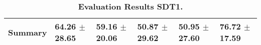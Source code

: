 \begin{table}[htb]
{\begin{tabular}{llllll}
\midrule
\textbf{Summary                                  } &                  \phantom{0}64.26 $\pm$ 28.65 &                      \phantom{0}59.16 $\pm$ 20.06 &                  \phantom{0}50.87 $\pm$ 29.62 &                  \phantom{0}50.95 $\pm$ 27.60 &            \phantom{0}76.72 $\pm$ 17.59 \\
\bottomrule
\end{tabular}%
}
\caption{\textbf{Evaluation Results SDT1.}}
\label{tab:eval-results}
\end{table}


